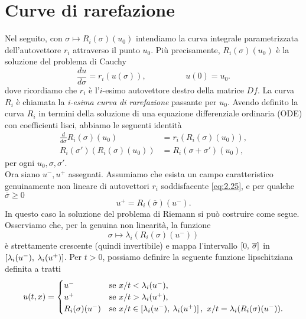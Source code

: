 \section{Curve di rarefazione}

Nel seguito, con $\sigma\mapsto R_{i}(\sigma)(u_{0})$ intendiamo la curva integrale parametrizzata dell'autovettore $r_{i}$ attraverso il punto $u_{0}$. Più precisamente, $R_{i}(\sigma)(u_{0})$ è la soluzione del problema di Cauchy
\begin{equation}\label{eq:2.26}
    \frac{du}{d\sigma}=r_{i}(u(\sigma)), \hspace{2cm} u(0)=u_{0}.
\end{equation}
dove ricordiamo che $r_{i}$ è l'$i$-esimo autovettore destro della matrice $Df$.
La curva $R_{i}$ è chiamata la \textit{i-esima curva di rarefazione} passante per $u_{0}$. Avendo definito la curva $R_{i}$ in termini della soluzione di una equazione differenziale ordinaria (ODE) con coefficienti lisci, abbiamo le seguenti identità
\begin{align}
    \frac{d}{d\sigma}R_{i}(\sigma)(u_{0}) &= r_{i}(R_{i}(\sigma)(u_{0})), \label{eq:2.27}\\
    R_{i}(\sigma ')(R_{i}(\sigma)(u_{0})) &= R_{i}(\sigma+\sigma ')(u_{0}), \label{eq:2.28}
\end{align}
per ogni $u_{0}, \sigma, \sigma '$.\\
Ora siano $u^{-}, u^{+}$ assegnati. Assumiamo che esista un campo caratteristico genuinamente non lineare di autovettori $r_{i}$ soddisfacente \eqref{eq:2.25}, e per qualche $\overline{\sigma}\geq 0$
\begin{equation}\label{eq:2.29}
    u^{+}=R_{i}(\overline{\sigma})(u^{-}).
\end{equation}
In questo caso la soluzione del problema di Riemann si può costruire come segue. Osserviamo che, per la genuina non linearità, la funzione
\begin{equation}\label{eq:2.30}
    \sigma\mapsto\lambda_{i}(R_{i}(\sigma)(u^{-}))
\end{equation}
è strettamente crescente (quindi invertibile) e mappa l'intervallo $\left[0,\hspace{0.075cm} \overline{\sigma}\right]$ in $\left[\lambda_{i}(u^{-}),\hspace{0.075cm}\lambda_{i}(u^{+})\right]$. Per $t>0$, possiamo definire la seguente funzione lipschitziana definita a tratti
\begin{equation}\label{eq:2.31}
    u(t,x) = 
    \begin{cases}
        u^{-} & \text{se} \ x/t<\lambda_{i}(u^{-}),\\
        u^{+} & \text{se} \ x/t>\lambda_{i}(u^{+}),\\
        R_{i}(\sigma)(u^{-}) & \text{se} \ x/t\in\left[\lambda_{i}(u^{-}),\hspace{0.075cm}\lambda_{i}(u^{+})\right],\ x/t=\lambda_{i}(R_{i}(\sigma)(u^{-})).
    \end{cases}
\end{equation}
